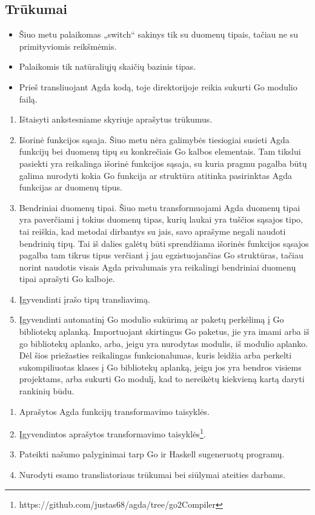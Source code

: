 \documentclass{VUMIFPSkursinis}
\begin{document}
\subsection{Trūkumai}
\begin{itemize}
	\item Šiuo metu palaikomas „switch“ sakinys tik su duomenų tipais, tačiau ne su primityviomis reikšmėmis.
	\item Palaikomis tik natūraliųjų skaičių bazinis tipas.
	\item Prieš transliuojant Agda kodą, toje direktorijoje reikia sukurti Go modulio failą.
\end{itemize}
\begin{enumerate}[noitemsep]
	\item Ištaisyti ankstesniame skyriuje aprašytus trūkumus.
  \item Išorinė funkcijos sąsaja. Šiuo metu nėra galimybės tiesiogiai susieti Agda funkcijų bei duomenų tipų su konkrečiais Go kalbos elementais. Tam tikslui pasiekti yra reikalinga išorinė funkcijos sąsaja, su kuria pragmu pagalba būtų galima nurodyti kokia Go funkcija ar struktūra atitinka pasirinktas Agda funkcijas ar duomenų tipus.
  \item Bendriniai duomenų tipai. Šiuo metu transformuojami Agda duomenų tipai yra paverčiami į tokius duomenų tipas, kurių laukai yra tuščios sąsajos tipo, tai reiškia, kad metodai dirbantys su jais, savo aprašyme negali naudoti bendrinių tipų. Tai iš dalies galėtų būti sprendžiama išorinės funkcijos sąsajos pagalba tam tikrus tipus verčiant į jau egzistuojančias Go struktūras, tačiau norint naudotis visais Agda privalumais yra reikalingi bendriniai duomenų tipai  aprašyti Go kalboje.
  \item Įgyvendinti įrašo tipų transliavimą. 
  \item Įgyvendinti automatinį Go modulio sukūrimą ar paketų perkėlimą į Go bibliotekų aplanką. Importuojant skirtingus Go paketus, jie yra imami arba iš go bibliotekų aplanko, arba, jeigu yra nurodytas modulis, iš modulio aplanko. Dėl šios priežasties reikalingas funkcionalumas, kuris leidžia arba perkelti sukompiliuotas klases į Go bibliotekų aplanką, jeigu jos yra bendros visiems projektams, arba sukurti Go modulį, kad to nereikėtų kiekvieną kartą daryti rankinių būdu.
\end{enumerate}
\begin{enumerate}[noitemsep]
  \item Aprašytos Agda funkcijų transformavimo taisyklės.
  \item Įgyvendintos aprašytos transformavimo taisyklės\footnote{https://github.com/justas68/agda/tree/go2Compiler}.
  \item Pateikti našumo palyginimai tarp Go ir Haskell sugeneruotų programų.
  \item Nurodyti esamo transliatoriaus trūkumai bei siūlymai ateities darbams.
\end{enumerate}
\end{document}
